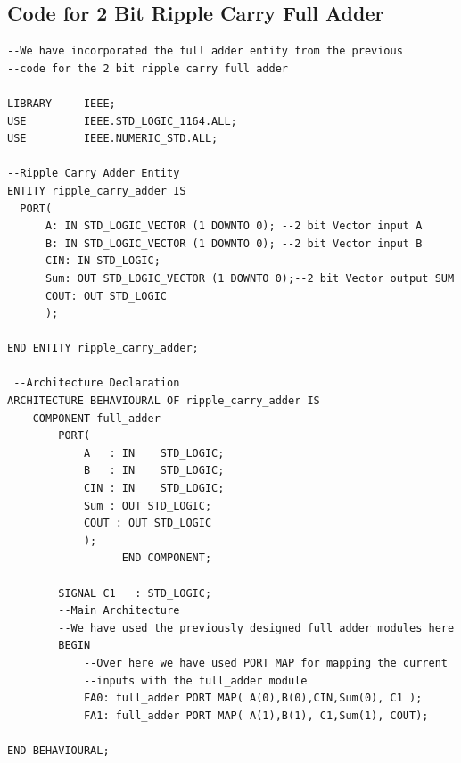 \documentclass[12pt,singleside,a4paper]{article}
\begin{document}
\newpage

\subsection{Code for 2 Bit Ripple Carry Full Adder}
\begin{lstlisting}[style=VHDL, frame=single,linewidth = 18cm]
--We have incorporated the full adder entity from the previous 
--code for the 2 bit ripple carry full adder

LIBRARY 	IEEE;
USE 		IEEE.STD_LOGIC_1164.ALL;
USE 		IEEE.NUMERIC_STD.ALL;

--Ripple Carry Adder Entity 
ENTITY ripple_carry_adder IS
  PORT(
	  A: IN STD_LOGIC_VECTOR (1 DOWNTO 0); --2 bit Vector input A
	  B: IN STD_LOGIC_VECTOR (1 DOWNTO 0); --2 bit Vector input B
	  CIN: IN STD_LOGIC;
	  Sum: OUT STD_LOGIC_VECTOR (1 DOWNTO 0);--2 bit Vector output SUM
	  COUT: OUT STD_LOGIC
	  );
			
END ENTITY ripple_carry_adder;
 
 --Architecture Declaration
ARCHITECTURE BEHAVIOURAL OF ripple_carry_adder IS
	COMPONENT full_adder
		PORT(
			A 	: IN 	STD_LOGIC;
			B 	: IN 	STD_LOGIC;
			CIN	: IN 	STD_LOGIC;
			Sum : OUT STD_LOGIC;
			COUT : OUT STD_LOGIC
			);
				  END COMPONENT;
 
		SIGNAL C1	: STD_LOGIC;
		--Main Architecture
		--We have used the previously designed full_adder modules here
		BEGIN
			--Over here we have used PORT MAP for mapping the current 
			--inputs with the full_adder module
			FA0: full_adder PORT MAP( A(0),B(0),CIN,Sum(0), C1 );
			FA1: full_adder PORT MAP( A(1),B(1), C1,Sum(1), COUT);
 
END BEHAVIOURAL;

\end{lstlisting}

\newpage
\end{document}
